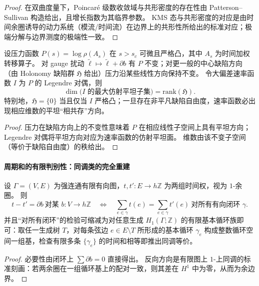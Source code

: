 \begin{proof}
在双曲度量下，Poincar\'e 级数收敛域与共形密度的存在性由 Patterson--Sullivan 构造给出，且增长指数为其临界参数。
KMS 态与共形密度的对应是由时间余圈诱导的动力系统（模流/时间流）在边界上的共形性所给出的标准对应；极端分解与边界测度的极端性一致。
\end{proof}

\begin{proposition}\label{prop:xi-defect-rank-controls-ldp-flatness}
设压力函数 \(P(s)=\log\rho(A_s)\) 在 \(s>s_c\) 可微且严格凸，其中 \(A_s\) 为时间加权转移算子。
对 gauge 扰动 \(\widetilde{\ell}\mapsto \widetilde{\ell}+\partial b\) 有 \(P\) 不变；对更一般的中心缺陷方向（由 Holonomy 缺陷群 \(\mathfrak H\) 给出）压力沿某些线性方向保持不变。
令大偏差速率函数 \(I\) 为 \(P\) 的 Legendre 对偶，则
\[
\dim\bigl(\text{\(I\) 的最大仿射平坦子集}\bigr)=\mathrm{rank}(\mathfrak H).
\]
特别地，\(\mathfrak H=\{0\}\) 当且仅当 \(I\) 严格凸；一旦存在非平凡缺陷自由度，速率函数必出现相应维数的平坦“相共存”方向。
\end{proposition}

\begin{proof}
压力在缺陷方向上的不变性意味着 \(P\) 在相应线性子空间上具有平坦方向；Legendre 对偶将平坦方向对应为速率函数的仿射平坦面。
维数由该不变子空间（等价于缺陷自由度）的秩给出。
\end{proof}

\paragraph{周期和的有限判别性：同调类的完全重建}

\begin{proposition}\label{prop:xi-cycle-sums-determine-time-cohomology}
设 \(\Gamma=(V,E)\) 为强连通有限有向图，\(t,t':E\to h\mathbb Z\) 为两组时间权，视为 \(1\)-余圈。
则
\[
t-t'=\partial b\ \text{对某 }b:V\to h\mathbb Z
\quad\Longleftrightarrow\quad
\sum_{e\in\gamma}t(e)=\sum_{e\in\gamma}t'(e)\ \text{对所有有向闭环 }\gamma.
\]
并且“对所有闭环”的检验可缩减为对任意生成 \(H_1(\Gamma;\mathbb Z)\) 的有限基本循环族即可：取任一生成树 \(T\)，对每条弦边 \(e\in E\setminus T\) 所形成的基本循环 \(\gamma_e\) 构成整数循环空间一组基，检查有限多条 \(\{\gamma_e\}\) 的时间和相等即推出同调等价。
\end{proposition}

\begin{proof}
必要性由闭环上 \(\sum\partial b=0\) 直接得出。
反向方向是有限图上 \(1\)-上同调的标准刻画：若两余圈在一组循环基上的配对一致，则其差在 \(H^1\) 中为零，从而为余边界。
\end{proof}
